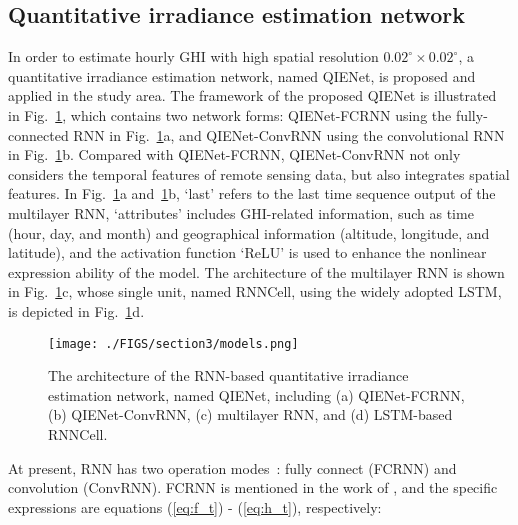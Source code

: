 \documentclass[review]{elsarticle}
\begin{document}
\subsection{Quantitative irradiance estimation network} %
\label{sub:QIENet model}
In order to estimate hourly GHI with high spatial resolution $0.02^{\circ}\times0.02^{\circ}$, a quantitative irradiance estimation network, named QIENet, is proposed and applied in the study area.
The framework of the proposed QIENet is illustrated in Fig.~\ref{fig:models}, which contains two network forms: QIENet-FCRNN using the fully-connected RNN in Fig.~\ref{fig:models}a, and QIENet-ConvRNN using the convolutional RNN in Fig.~\ref{fig:models}b.
Compared with QIENet-FCRNN, QIENet-ConvRNN not only considers the temporal features of remote sensing data, but also integrates spatial features.
In Fig.~\ref{fig:models}a and~\ref{fig:models}b, `last' refers to the last time sequence output of the multilayer RNN,
`attributes' includes GHI-related information, such as time (hour, day, and month) and geographical information (altitude, longitude, and latitude),
and the activation function `ReLU' is used to enhance the nonlinear expression ability of the model.
The architecture of the multilayer RNN is shown in Fig.~\ref{fig:models}c, whose single unit, named RNNCell, using the widely adopted LSTM, is depicted in Fig.~\ref{fig:models}d.

\begin{figure}[!hbp]
    \centering
    \texttt{[image: ./FIGS/section3/models.png]}
    \caption{The architecture of the RNN-based quantitative irradiance estimation network, named QIENet, including (a) QIENet-FCRNN, (b) QIENet-ConvRNN, (c) multilayer RNN, and (d) LSTM-based RNNCell.}
    \label{fig:models}
\end{figure}

At present, RNN has two operation modes~\citep{Graves2013LSTM, shi2015convLSTM}: fully connect (FCRNN) and convolution (ConvRNN). FCRNN is mentioned in the work of \citet{Graves2013LSTM}, and the specific expressions are equations (\ref{eq:f_t}) - (\ref{eq:h_t}), respectively:
\end{document}
